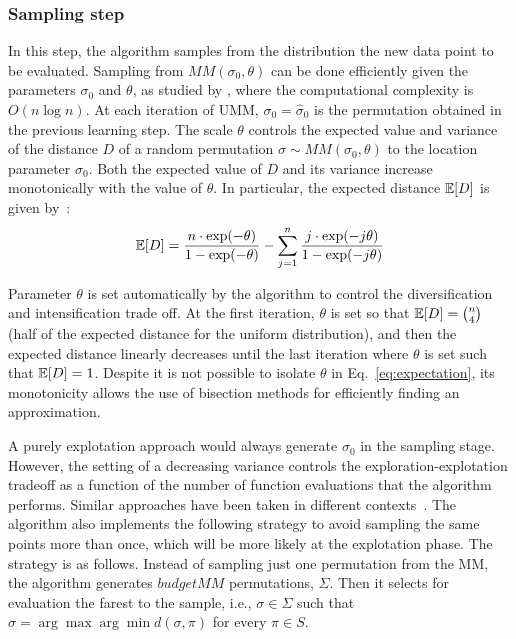 \documentclass[runningheads]{llncs}
\begin{document}
\subsubsection{Sampling step}\label{sec:sampling}
In this step, the algorithm samples from the distribution the new data point to be evaluated. 
Sampling from $MM(\sigma_0,\theta)$  can be done efficiently given the parameters  $\sigma_0$ and $\theta$, as studied by \citet{IruCalLoz2016permallows}, where the computational complexity is $O(n\log n)$. %
%
At each iteration of UMM, $\sigma_0=\hat\sigma_0$ is the permutation obtained in the previous learning step. The scale $\theta$ controls the expected value and variance of the distance $D$ of a random permutation $\sigma\sim MM(\sigma_0, \theta)$ to the location parameter $\sigma_0$. Both  the expected value of $D$ and its variance increase monotonically with the value of $\theta$. In particular, the expected distance $\mathbb{E}[D]$ is given by~\cite{FliVer1986}:
%
\begin{equation}\label{eq:expectation}
\mathbb{E}[D] = \frac{n \cdot \exp(-\theta)}{1-\exp(-\theta)} - \sum_{j=1}^{n}  \frac{j\cdot\exp(-j  \theta)}{1-\exp(-j\theta)}
\end{equation}

Parameter $\theta$ is set automatically by the algorithm to control the diversification and intensification trade off. At the first iteration, $\theta$ is set so that  $\mathbb{E}[D] = \binom{n}{4}$ (half of the expected distance for the uniform distribution), and then the expected distance linearly decreases until the last iteration where $\theta$ is set such that $\mathbb{E}[D] = 1$. Despite it is not possible to isolate $\theta$ in Eq.~\eqref{eq:expectation}, its monotonicity allows the use of bisection methods for efficiently finding an approximation. 



A purely explotation approach would always generate $\sigma_0$ in the sampling stage. However, the setting of a decreasing variance   controls the exploration-explotation tradeoff as a function of the number of function evaluations that the algorithm performs.  Similar approaches have been taken in different contexts~\cite{ArzCebPer2019qap}. The algorithm also implements the following strategy to avoid sampling the same points more than once, which will be more likely at the explotation phase. The strategy is as follows. Instead of sampling just one permutation from the MM, the algorithm generates $budgetMM$ permutations, $\Sigma$. Then it selects  for evaluation the farest to the sample, i.e.,  $\sigma\in \Sigma$ such that $\sigma = \arg\max\arg\min d(\sigma, \pi)$ for every $\pi\in S$. 
\end{document}
